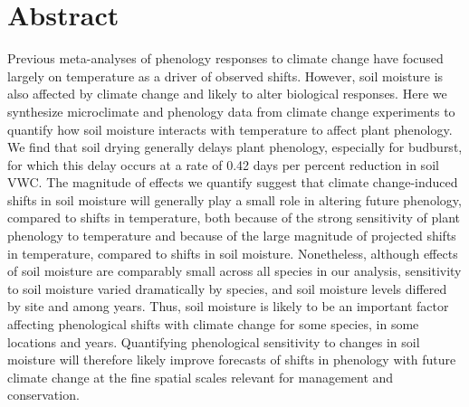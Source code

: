 \documentclass{article}
\begin{document}







\linenumbers
\section*{Abstract}
Previous meta-analyses of phenology responses to climate change have focused largely on temperature as a driver of observed shifts. However, soil moisture is also affected by climate change and likely to alter biological responses. Here we synthesize microclimate and phenology data from climate change experiments to quantify how soil moisture interacts with temperature to affect plant phenology. We find that soil drying generally delays plant phenology, especially for budburst, for which this delay occurs at a rate of 0.42 days per percent reduction in soil VWC. The magnitude of effects we quantify suggest that climate change-induced shifts in soil moisture will generally play a small role in altering future phenology, compared to shifts in temperature, both because of the strong sensitivity of plant phenology to temperature and because of the large magnitude of projected shifts in temperature, compared to shifts in soil moisture. Nonetheless, although effects of soil moisture are comparably small across all species in our analysis, sensitivity to soil moisture varied dramatically by species, and soil moisture levels differed by site and among years. Thus, soil moisture is likely to be an important factor affecting phenological shifts with climate change for some species, in some locations and years. Quantifying phenological sensitivity to changes in soil moisture will therefore likely improve forecasts of shifts in phenology with future climate change at the fine spatial scales relevant for management and conservation.  

\newpage
\end{document}
